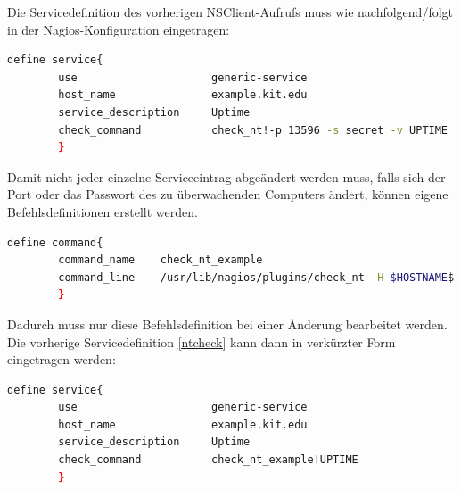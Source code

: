 Die Servicedefinition des vorherigen NSClient-Aufrufs muss wie nachfolgend/folgt in der Nagios-Konfiguration eingetragen:
\begin{lstlisting}[captionpos=b, caption=Servicedefinition des NSClient-Checks, label=nt-servdef, breaklines = true, language=sh]
define service{
        use                     generic-service
        host_name               example.kit.edu
        service_description     Uptime
        check_command           check_nt!-p 13596 -s secret -v UPTIME
        }
\end{lstlisting}

Damit nicht jeder einzelne Serviceeintrag abgeändert werden muss, falls sich der Port oder das Passwort des zu überwachenden Computers ändert, können eigene Befehlsdefinitionen erstellt werden.

\begin{lstlisting}[captionpos=b, caption=Server spezifische Befehlsdefinition, label=cus-nt-servdef, breaklines = true, language=sh]        
define command{
        command_name    check_nt_example
        command_line    /usr/lib/nagios/plugins/check_nt -H $HOSTNAME$ -p 13597 -p secret -v $ARG1$
        }
\end{lstlisting}

Dadurch muss nur diese Befehlsdefinition bei einer Änderung bearbeitet werden.
Die vorherige Servicedefinition \ref{ntcheck} kann dann in verkürzter Form eingetragen werden:

\begin{lstlisting}[captionpos=b, caption=Verkürzte Servicedefinition des NSClient-Checks, label=nt-servdef, breaklines = true, language=sh]
define service{
        use                     generic-service
        host_name               example.kit.edu
        service_description     Uptime
        check_command           check_nt_example!UPTIME
        }
\end{lstlisting}


